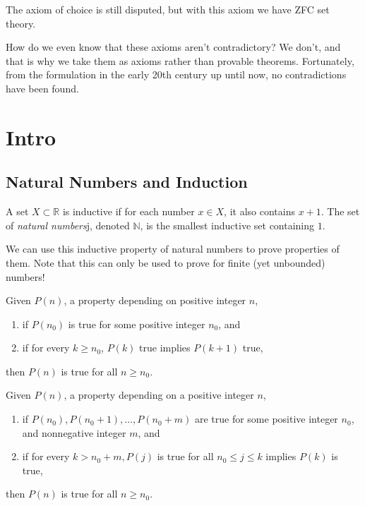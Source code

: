 \documentclass{article}
\begin{document}
    The axiom of choice is still disputed, but with this axiom we have ZFC set theory. 

    \begin{axiom}
      
    \end{axiom}

    How do we even know that these axioms aren't contradictory? We don't, and that is why we take them as axioms rather than provable theorems. Fortunately, from the formulation in the early 20th century up until now, no contradictions have been found. 

\section{Intro} 

  \subsection{Natural Numbers and Induction}

    \begin{definition}
    A set $X \subset \mathbb{R}$ is inductive if for each number $x \in X$, it also contains $x + 1$. The set of \textit{natural numbers}j, denoted $\mathbb{N}$, is the smallest inductive set containing $1$. 
    \end{definition}

    We can use this inductive property of natural numbers to prove properties of them. Note that this can only be used to prove for finite (yet unbounded) numbers! 

    \begin{lemma}
    Given $P(n)$, a property depending on positive integer $n$, 
    \begin{enumerate}
        \item if $P(n_0)$ is true for some positive integer $n_0$, and
        \item if for every $k \geq n_0$, $P(k)$ true implies $P(k+1)$ true, 
    \end{enumerate}
    then $P(n)$ is true for all $n \geq n_0$. 
    \end{lemma}

    \begin{lemma}
    Given $P(n)$, a property depending on a positive integer $n$, 
    \begin{enumerate}
        \item if $P(n_0), P(n_0 + 1), \ldots, P(n_0 + m)$ are true for some positive integer $n_0$, and nonnegative integer $m$, and 
        \item if for every $k > n_0 + m, P(j)$ is true for all $n_0 \leq j \leq k$ implies $P(k)$ is true, 
    \end{enumerate}
    then $P(n)$ is true for all $n \geq n_0$. 
    \end{lemma}
\end{document}
